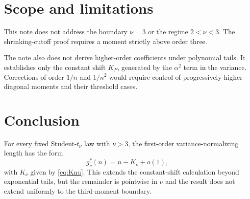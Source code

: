 \documentclass[11pt,a4paper]{article}
\begin{document}
\section{Scope and limitations}
This note does not address the boundary $\nu=3$ or the regime $2<\nu<3$.
The shrinking-cutoff proof requires a moment strictly above order three.

The note also does not derive higher-order coefficients under polynomial tails.
It establishes only the constant shift $K_F$, generated by the $\alpha^2$ term
in the variance.  Corrections of order $1/n$ and $1/n^2$ would require control
of progressively higher diagonal moments and their threshold cases.

\section{Conclusion}
For every fixed Student-$t_\nu$ law with $\nu>3$, the first-order
variance-normalizing length has the form
\[
g_\nu^*(n)=n-K_\nu+o(1),
\]
with $K_\nu$ given by \eqref{eq:Knu}.  This extends the constant-shift
calculation beyond exponential tails, but the remainder is pointwise in
$\nu$ and the result does not extend uniformly to the third-moment boundary.
\end{document}
